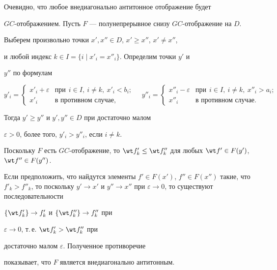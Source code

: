 \begin{pf}


Очевидно, что любое внедиагонально антитонное отображение будет


$GC$-отображением. Пусть $F$ --- полунепрерывное снизу $GC$-отображение на $D$.


Выберем произвольно точки $x', x'' \in D$, $x'\ge x''$, $x'\neq x''$,


и любой индекс $k \in I = \{ i\mid x'_i = x''_i\}$. Определим точки $y'$ и


$y''$ по формулам


$$


y'_{i}=\begin{cases}


x'_i+\varepsilon & \text{при}


\ \ i \in I, \ i \neq k, \ x'_i<b_i; \\


x'_i & \text{в противном случае},


\end{cases} 


\quad


y''_{i}=\begin{cases}


x''_i-\varepsilon & \text{при}


\ \ i \in I, \ i \neq k, \ x''_i>a_i; \\


x''_i & \text{в противном случае}.


\end{cases}


$$


Тогда $y' \ge y''$ и $y',y'' \in D$ при достаточно малом


$\varepsilon >0$, более того, $y'_i>y''_i$, если $i \neq k$.


Поскольку $F$ есть $GC$-отображение, то $\wt f'_k \le \wt


f''_k$ для любых $\wt f' \in F(y')$, $\wt f'' \in F(y'')$.


Если предположить, что найдутся элементы $f' \in F(x')$, $f'' \in


F(x'')$ такие, что $f'_k > f''_k$, то поскольку $y' \to x'$ и $y''


\to x''$ при $\varepsilon \to 0$, то существуют последовательности


$\{ \wt f'_k  \} \to f'_k$ и $\{ \wt f''_k \} \to f''_k$ при


$\varepsilon \to 0$, т.\,е. $ \wt f'_k > \wt f''_k$ при


достаточно малом $\varepsilon$. Полученное противоречие


показывает, что $F$ является внедиагонально антитонным.


\end{pf}








